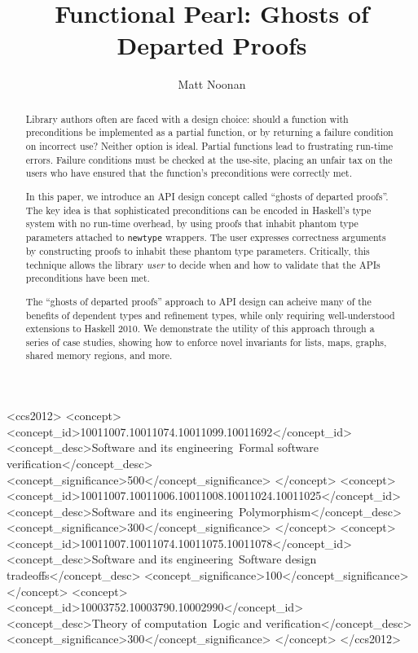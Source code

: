\documentclass[format=sigplan, review=false, screen=true]{acmart}
\begin{document}
\title[Ghosts of Departed Proofs]{Functional Pearl: Ghosts of Departed Proofs}

\author{Matt Noonan}


\begin{abstract}

  Library authors often are faced with a design choice: should a function with
  preconditions be implemented as a partial function, or by returning a failure
  condition on incorrect use? Neither option is ideal. Partial functions lead
  to frustrating run-time errors. Failure conditions must be checked
  at the use-site,
  placing an unfair tax on the users who have ensured that the function's
  preconditions were correctly met.
  
  In this paper, we introduce an API design concept called ``ghosts of departed
  proofs''. The key idea is that sophisticated preconditions can be
  encoded in Haskell's type system with no run-time overhead, by using proofs
  that inhabit phantom type parameters attached to \texttt{newtype} wrappers.
  The user expresses correctness arguments by constructing proofs to inhabit
  these phantom type parameters. Critically, this technique allows the
  library \emph{user} to decide when and how to validate that the APIs preconditions
  have been met.

  The ``ghosts of departed proofs'' approach to API design can acheive many of the benefits
  of dependent types and refinement types, while only requiring well-understood extensions to
  Haskell 2010. We demonstrate the utility of this approach
  through a series of case studies, showing how to enforce novel invariants for lists,
  maps, graphs, shared memory regions, and more.
\end{abstract}


%
%
 \begin{CCSXML}
<ccs2012>
<concept>
<concept_id>10011007.10011074.10011099.10011692</concept_id>
<concept_desc>Software and its engineering~Formal software verification</concept_desc>
<concept_significance>500</concept_significance>
</concept>
<concept>
<concept_id>10011007.10011006.10011008.10011024.10011025</concept_id>
<concept_desc>Software and its engineering~Polymorphism</concept_desc>
<concept_significance>300</concept_significance>
</concept>
<concept>
<concept_id>10011007.10011074.10011075.10011078</concept_id>
<concept_desc>Software and its engineering~Software design tradeoffs</concept_desc>
<concept_significance>100</concept_significance>
</concept>
<concept>
<concept_id>10003752.10003790.10002990</concept_id>
<concept_desc>Theory of computation~Logic and verification</concept_desc>
<concept_significance>300</concept_significance>
</concept>
</ccs2012>
\end{CCSXML}
\end{document}
